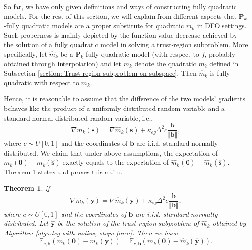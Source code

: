 \documentclass[colorlinks=true, linkcolor=blue, citecolor=blue, urlcolor=blue]{article}
\theoremstyle{plain}
\newtheorem{theorem}{Theorem}[section]
\theoremstyle{definition}
\theoremstyle{remark}
\begin{document}
So far, we have only given definitions and ways of constructing fully quadratic models. For the rest of this section, we will explain from different aspects that $\bm P_k$-fully quadratic models are a proper substitute for quadratic $m_k$ in DFO settings.
Such properness is mainly depicted by the function value decrease achieved by the solution of a fully quadratic model in solving a trust-region subproblem. More specifically, let $\hat{m}_k$ be a $\bm P_k$-fully quadratic model (with respect to $f$, probably obtained through interpolation) and let $m_k$ denote the quadratic $m_k$ defined in Subsection \ref{section: Trust region subproblem on subspace}. Then $\hat{m}_k$ is fully quadratic with respect to $m_k$.

Hence, it is reasonable to assume that the difference of the two models' gradients behaves like the product of a uniformly distributed random variable and a standard normal distributed random variable, i.e.,  
\begin{equation*}
        \nabla m_k(\bm s)=\nabla \hat{m}_k(\bm s)+\kappa_{eg}\Delta^2c\frac{\bm b}{\Vert \bm b\Vert},
    \end{equation*}
    where $c\sim U[0,1]$ and the coordinates of $\bm b$ are i.i.d. standard normally distributed. We claim that under above assumptions, the expectation of $m_k(\bm 0)-m_k(\hat{\bm s})$ exactly equals to the expectation of $\hat{m}_k(\bm 0)-\hat{m}_k(\hat{\bm s})$. Theorem \ref{thm:error bound of fully quadratic models} states and proves this claim.

\begin{theorem}\label{thm:error bound of fully quadratic models}
    If 
    \begin{equation}\label{eq:nabl m and nabla hat_m}
        \nabla m_k(\bm y)=\nabla \hat{m}_k(\bm y)+\kappa_{eg}\Delta^2c\frac{\bm b}{\Vert \bm b\Vert},
    \end{equation}
    where $c\sim U[0,1]$ and the coordinates of $\bm b$ are i.i.d. standard normally distributed.    
    Let $\hat{\bm y}$ be the solution of the trust-region subproblem of $\hat{m}_k$ obtained by Algorithm \ref{algo:tcg with radius, steps form}.
    Then we have
    \begin{equation*}
        \mathbb{E}_{c,\bm b}(m_k(\bm 0)-m_k(\hat{\bm y}))=\mathbb{E}_{c,\bm b}(\hat{m}_k(\bm 0)-\hat{m}_k(\hat{\bm y})).
    \end{equation*}
\end{theorem}
\end{document}
